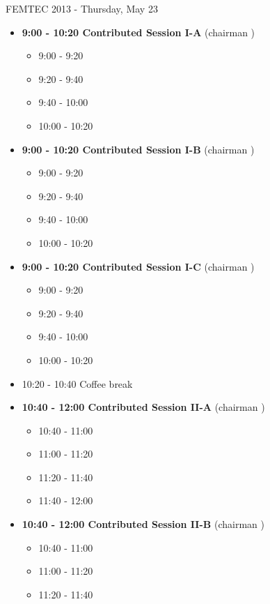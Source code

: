 \documentclass[10pt, A4]{article}%
\begin{document}
\newpage
\newpage

\centerline{\huge FEMTEC 2013 - Thursday, May 23}
\vspace{4mm}

\begin{itemize}    
\item {\bf 9:00 - 10:20 Contributed Session I-A} (chairman ) 
  \begin{itemize}
    \item 9:00 - 9:20 
    \item 9:20 - 9:40 
    \item 9:40 - 10:00 
    \item 10:00 - 10:20  
  \end{itemize}
  \item {\bf 9:00 - 10:20 Contributed Session I-B} (chairman ) 
  \begin{itemize}
    \item 9:00 - 9:20 
    \item 9:20 - 9:40 
    \item 9:40 - 10:00 
    \item 10:00 - 10:20      
  \end{itemize}
    \item {\bf 9:00 - 10:20 Contributed Session I-C} (chairman ) 
  \begin{itemize}
    \item 9:00 - 9:20 
    \item 9:20 - 9:40 
    \item 9:40 - 10:00 
    \item 10:00 - 10:20      
  \end{itemize}
  \item 10:20 - 10:40 Coffee break
  \item {\bf 10:40 - 12:00 Contributed Session II-A} (chairman ) 
  \begin{itemize}
    \item 10:40 - 11:00
    \item 11:00 - 11:20 
    \item 11:20 - 11:40 
    \item 11:40 - 12:00 
  \end{itemize}
  \item {\bf 10:40 - 12:00 Contributed Session II-B} (chairman ) 
  \begin{itemize}
    \item 10:40 - 11:00
    \item 11:00 - 11:20 
    \item 11:20 - 11:40 

\end{itemize}
\end{itemize}
\end{document}
